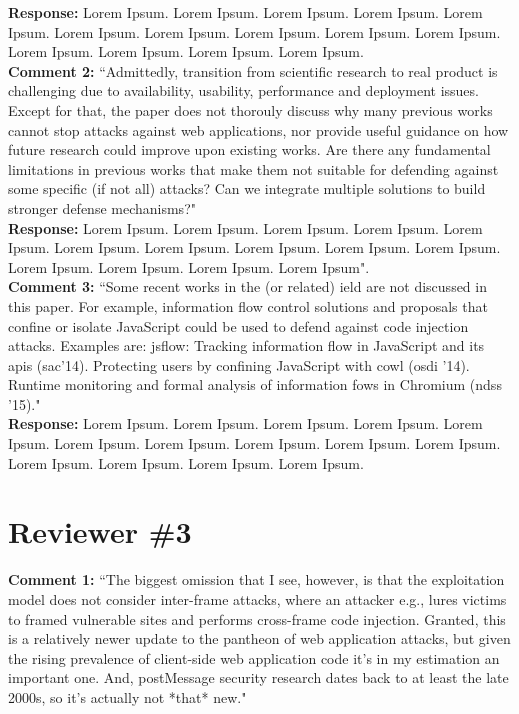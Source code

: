 \documentclass[10pt,journal,compsoc]{IEEEtran}
\begin{document}
\noindent
{\bf Response:}
Lorem Ipsum. Lorem Ipsum. Lorem Ipsum. Lorem Ipsum. Lorem Ipsum. Lorem Ipsum. Lorem Ipsum. Lorem Ipsum. Lorem Ipsum. Lorem Ipsum. Lorem Ipsum. Lorem Ipsum. Lorem Ipsum. Lorem Ipsum.\\

\noindent
{\bf Comment 2:} ``Admittedly, transition from scientific research to real product
is challenging due to availability, usability, performance and deployment issues.
Except for that, the paper does not thorouly discuss why many previous works
cannot stop attacks against web applications, nor provide useful guidance on
how future research could improve upon existing works. Are there any fundamental
limitations in previous works that make them not suitable for defending against
some specific (if not all) attacks? Can we integrate multiple solutions to build
stronger defense mechanisms?"\\

\noindent
{\bf Response:}
Lorem Ipsum. Lorem Ipsum. Lorem Ipsum. Lorem Ipsum. Lorem Ipsum. Lorem Ipsum. Lorem Ipsum. Lorem Ipsum. Lorem Ipsum. Lorem Ipsum. Lorem Ipsum. Lorem Ipsum. Lorem Ipsum. Lorem Ipsum".\\

\noindent
{\bf Comment 3:} ``Some recent works in the (or related) 
ield are not discussed in this paper.
For example, information flow control solutions and
proposals that confine or isolate JavaScript could
be used to defend against code injection attacks.
Examples are: {\sc jsf}low: Tracking information
flow in JavaScript and its {\sc api}s ({\sc sac}'14).
Protecting users by confining JavaScript with {\sc cowl} ({\sc osdi} '14).
Runtime monitoring and formal analysis of information fows in Chromium ({\sc ndss} '15)."\\

\noindent
{\bf Response:}
Lorem Ipsum. Lorem Ipsum. Lorem Ipsum. Lorem Ipsum. Lorem Ipsum. Lorem Ipsum. Lorem Ipsum. Lorem Ipsum. Lorem Ipsum. Lorem Ipsum. Lorem Ipsum. Lorem Ipsum. Lorem Ipsum. Lorem Ipsum.\\

\section{Reviewer \#3}
\label{sec:r3}

{\bf Comment 1:} ``The biggest omission that I see, however, is that the
exploitation model does not consider inter-frame attacks, where an attacker
e.g., lures victims to framed vulnerable sites and performs cross-frame code
injection.  Granted, this is a relatively newer update to the pantheon of
web application attacks, but given the rising prevalence of client-side
web application code it's in my estimation an important one.  And, postMessage
security research dates back to at least the late 2000s, so it's actually not
*that* new."\\
\end{document}
